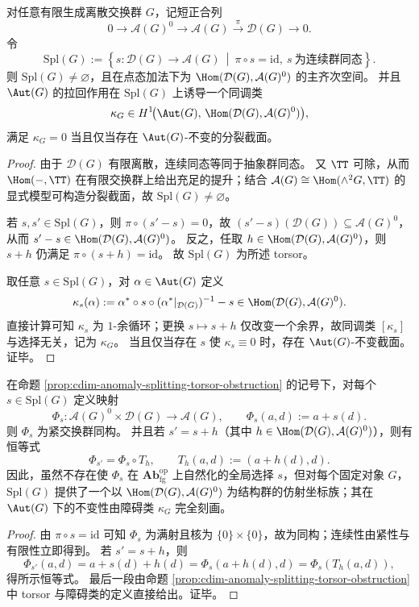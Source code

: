 \begin{proposition}\label{prop:cdim-anomaly-splitting-torsor-obstruction}
对任意有限生成离散交换群 \(G\)，记短正合列
\[
0\longrightarrow \mathcal A(G)^0\longrightarrow \mathcal A(G)\overset{\pi}{\longrightarrow}\mathcal D(G)\longrightarrow 0.
\]
令
\[
\mathrm{Spl}(G):=\left\{s:\mathcal D(G)\to\mathcal A(G)\ \middle|\ \pi\circ s=\mathrm{id},\ s\ \text{为连续群同态}\right\}.
\]
则 \(\mathrm{Spl}(G)\neq\varnothing\)，且在点态加法下为 \(\Hom(\mathcal D(G),\mathcal A(G)^0)\) 的主齐次空间。
并且 \(\Aut(G)\) 的拉回作用在 \(\mathrm{Spl}(G)\) 上诱导一个同调类
\[
\kappa_G\in H^1\!\bigl(\Aut(G),\,\Hom(\mathcal D(G),\mathcal A(G)^0)\bigr),
\]
满足 \(\kappa_G=0\) 当且仅当存在 \(\Aut(G)\)-不变的分裂截面。
\end{proposition}
\begin{proof}
由于 \(\mathcal D(G)\) 有限离散，连续同态等同于抽象群同态。
又 \(\TT\) 可除，从而 \(\Hom(-,\TT)\) 在有限交换群上给出充足的提升；结合 \(\mathcal A(G)\cong\Hom(\wedge^2G,\TT)\) 的显式模型可构造分裂截面，故 \(\mathrm{Spl}(G)\neq\varnothing\)。

若 \(s,s'\in\mathrm{Spl}(G)\)，则 \(\pi\circ(s'-s)=0\)，故 \((s'-s)(\mathcal D(G))\subseteq \mathcal A(G)^0\)，从而 \(s'-s\in\Hom(\mathcal D(G),\mathcal A(G)^0)\)。
反之，任取 \(h\in\Hom(\mathcal D(G),\mathcal A(G)^0)\)，则 \(s+h\) 仍满足 \(\pi\circ(s+h)=\mathrm{id}\)。
故 \(\mathrm{Spl}(G)\) 为所述 torsor。

取任意 \(s\in\mathrm{Spl}(G)\)，对 \(\alpha\in\Aut(G)\) 定义
\[
\kappa_s(\alpha):=\alpha^\ast\circ s\circ(\alpha^\ast|_{\mathcal D(G)})^{-1}-s\in\Hom(\mathcal D(G),\mathcal A(G)^0).
\]
直接计算可知 \(\kappa_s\) 为 \(1\)-余循环；更换 \(s\mapsto s+h\) 仅改变一个余界，故同调类 \([\kappa_s]\) 与选择无关，记为 \(\kappa_G\)。
当且仅当存在 \(s\) 使 \(\kappa_s\equiv 0\) 时，存在 \(\Aut(G)\)-不变截面。证毕。
\end{proof}

\begin{theorem}\label{thm:cdim-anomaly-affine-regular-form}
在命题 \ref{prop:cdim-anomaly-splitting-torsor-obstruction} 的记号下，对每个 \(s\in\mathrm{Spl}(G)\) 定义映射
\[
\Phi_s:\mathcal A(G)^0\times \mathcal D(G)\longrightarrow \mathcal A(G),
\qquad
\Phi_s(a,d):=a+s(d).
\]
则 \(\Phi_s\) 为紧交换群同构。
并且若 \(s'=s+h\)（其中 \(h\in\Hom(\mathcal D(G),\mathcal A(G)^0)\)），则有恒等式
\[
\Phi_{s'}=\Phi_s\circ T_h,
\qquad
T_h(a,d):=(a+h(d),d).
\]
因此，虽然不存在使 \(\Phi_s\) 在 \(\mathbf{Ab}_{\mathrm{fg}}^{\mathrm{op}}\) 上自然化的全局选择 \(s\)，但对每个固定对象 \(G\)，\(\mathrm{Spl}(G)\) 提供了一个以 \(\Hom(\mathcal D(G),\mathcal A(G)^0)\) 为结构群的仿射坐标族；其在 \(\Aut(G)\) 下的不变性由障碍类 \(\kappa_G\) 完全刻画。
\end{theorem}
\begin{proof}
由 \(\pi\circ s=\mathrm{id}\) 可知 \(\Phi_s\) 为满射且核为 \(\{0\}\times\{0\}\)，故为同构；连续性由紧性与有限性立即得到。
若 \(s'=s+h\)，则
\[
\Phi_{s'}(a,d)=a+s(d)+h(d)=\Phi_s(a+h(d),d)=\Phi_s(T_h(a,d)),
\]
得所示恒等式。
最后一段由命题 \ref{prop:cdim-anomaly-splitting-torsor-obstruction} 中 torsor 与障碍类的定义直接给出。证毕。
\end{proof}

